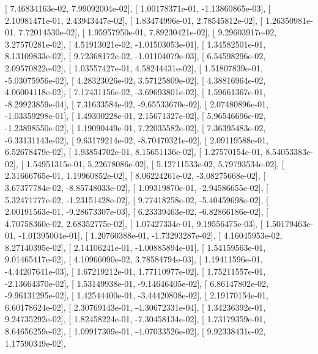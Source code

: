 \documentclass{article}
\begin{document}
       [  7.46834163e-02,   7.99092004e-02],
       [  1.00178371e-01,  -1.13860865e-03],
       [  2.10981471e-01,   2.43943447e-02],
       [  1.83474996e-01,   2.78545812e-02],
       [  1.26350981e-01,   7.72014530e-02],
       [  1.95957950e-01,   7.89230421e-02],
       [  9.29603917e-02,   3.27570281e-02],
       [  4.51913021e-02,  -1.01503053e-01],
       [  1.34582501e-01,   8.13109833e-02],
       [  9.72368172e-02,  -1.01104079e-03],
       [  6.54598296e-02,   2.09570822e-02],
       [  1.03557427e-01,   4.58244431e-02],
       [  1.51807839e-01,  -5.03075956e-02],
       [  4.28323026e-02,   3.57125809e-02],
       [  4.38816964e-02,   4.06004118e-02],
       [  7.17431156e-02,  -3.69693801e-02],
       [  1.59661367e-01,  -8.29923859e-04],
       [  7.31633584e-02,  -9.65533670e-02],
       [  2.07480896e-01,  -1.03359298e-01],
       [  1.49300228e-01,   2.15671327e-02],
       [  5.96546696e-02,  -1.23898550e-02],
       [  1.19090449e-01,   7.22035582e-02],
       [  7.36395483e-02,  -6.33131143e-02],
       [  9.63179214e-02,  -8.70470321e-02],
       [  2.09119588e-01,   6.52678479e-02],
       [  1.93854702e-01,   8.15651136e-02],
       [  1.27570154e-01,   8.54053383e-02],
       [  1.54951315e-01,   5.22678086e-02],
       [  5.12711533e-02,   5.79793534e-02],
       [  2.31666765e-01,   1.19960852e-02],
       [  8.06224261e-02,  -3.08275668e-02],
       [  3.67377784e-02,  -8.85748033e-02],
       [  1.09319870e-01,  -2.94586655e-02],
       [  5.32471777e-02,  -1.23151428e-02],
       [  9.77418258e-02,  -5.40459698e-02],
       [  2.00191563e-01,  -9.28673307e-03],
       [  6.23339463e-02,  -6.82866186e-02],
       [  4.70758360e-02,   2.68352775e-02],
       [  1.07427334e-01,   9.19556475e-03],
       [  1.50179463e-01,  -1.01395004e-01],
       [  1.20760388e-01,  -1.73293287e-02],
       [  4.16045953e-02,   8.27140395e-02],
       [  2.14106241e-01,  -1.00885894e-01],
       [  1.54159563e-01,   9.01465417e-02],
       [  4.10966090e-02,   3.78584794e-03],
       [  1.19411596e-01,  -4.44207641e-03],
       [  1.67219212e-01,   1.77110977e-02],
       [  1.75211557e-01,  -2.13664370e-02],
       [  1.53149938e-01,  -9.14646405e-02],
       [  6.86147802e-02,  -9.96131295e-02],
       [  1.42544400e-01,  -3.44420808e-02],
       [  2.19170154e-01,   6.60178624e-02],
       [  2.30769143e-01,  -4.30672331e-04],
       [  1.34236392e-01,   9.24735292e-02],
       [  1.82458224e-01,  -7.30458134e-02],
       [  1.73179359e-01,   8.64656259e-02],
       [  1.09917309e-01,  -4.07033526e-02],
       [  9.92338431e-02,   1.17590349e-02],
\end{document}
